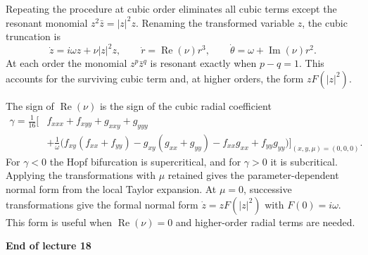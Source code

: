 \documentclass[11pt,a4paper]{article}
\begin{document}
\newpage
\noindent Repeating the procedure at cubic order eliminates all cubic
terms except the resonant monomial $z^2\bar z=|z|^2z$. Renaming the
transformed variable $z$, the cubic truncation is
\[
\dot z=i\omega z+\nu |z|^2z,\qquad
\dot r=\operatorname{Re}(\nu)r^3,\qquad
\dot\theta=\omega+\operatorname{Im}(\nu)r^2.
\]
At each order the monomial $z^p\bar z^q$ is resonant exactly when
$p-q=1$. This accounts for the surviving cubic term and, at higher
orders, the form $zF(|z|^2)$.

\noindent The sign of $\operatorname{Re}(\nu)$ is the sign of the
cubic radial coefficient
\[
\begin{aligned}
\gamma=\frac1{16}\Big[&
f_{xxx}+f_{xyy}+g_{xxy}+g_{yyy}\\
&+\frac1\omega\big(
f_{xy}(f_{xx}+f_{yy})-g_{xy}(g_{xx}+g_{yy})
-f_{xx}g_{xx}+f_{yy}g_{yy}\big)
\Big]_{(x,y,\mu)=(0,0,0)}.
\end{aligned}
\]
For $\gamma<0$ the Hopf bifurcation is supercritical, and for
$\gamma>0$ it is subcritical. Applying the transformations with
$\mu$ retained gives the parameter-dependent normal form from the
local Taylor expansion. At $\mu=0$, successive transformations
give the formal normal form $\dot z=zF(|z|^2)$ with $F(0)=i\omega$.
This form is useful when $\operatorname{Re}(\nu)=0$ and
higher-order radial terms are needed.
\begin{center}
\textbf{End of lecture 18}
\end{center}
\end{document}
